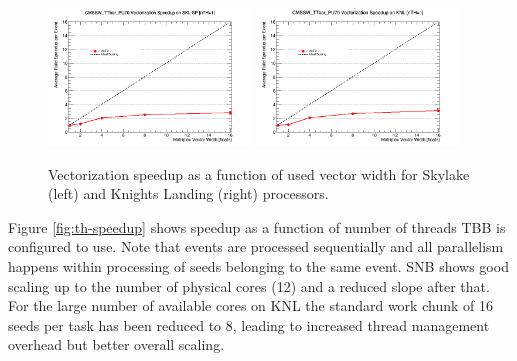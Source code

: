 \documentclass{webofc}
\def\twop{0.48\textwidth}
\def\postfigskip{\vskip-4mm}
\begin{document}
\begin{figure}[htb]
  \centering
  \includegraphics[width=\twop]{figs/comp/SKL-SP_CMSSW_TTbar_PU70_VU_speedup.png}
  \hfill
  \includegraphics[width=\twop]{figs/comp/KNL_CMSSW_TTbar_PU70_VU_speedup.png}
  \postfigskip

  \caption{Vectorization speedup as a function of used vector width for
    Skylake (left) and Knights Landing (right)
    processors.}
  \label{fig:vu-speedup}
\end{figure}

Figure \ref{fig:th-speedup} shows speedup as a function of number of threads
TBB is configured to use. Note that events are processed sequentially and all
parallelism happens within processing of seeds belonging to the same
event. SNB shows good scaling up to the number of physical cores (12) and a
reduced slope after that. For the large number of available cores on KNL the
standard work chunk of 16 seeds per task has been reduced to 8, leading to
increased thread management overhead but better overall scaling.
\end{document}
